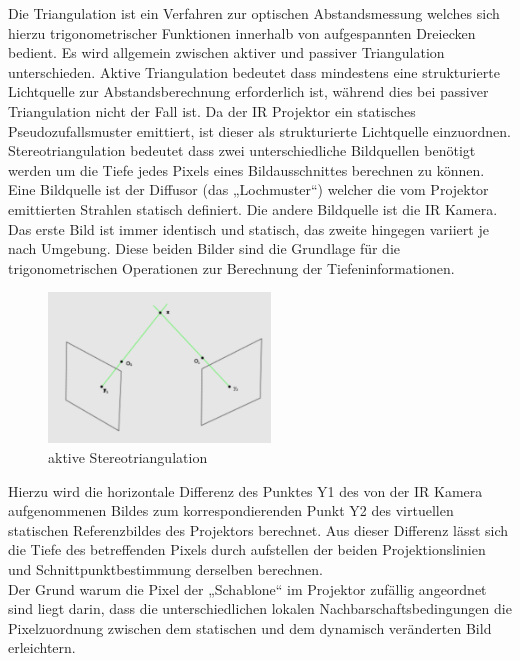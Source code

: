 Die Triangulation ist ein Verfahren zur optischen Abstandsmessung welches sich hierzu trigonometrischer Funktionen innerhalb von aufgespannten Dreiecken bedient. 
Es wird allgemein zwischen aktiver und passiver Triangulation unterschieden.
Aktive Triangulation bedeutet dass mindestens eine strukturierte Lichtquelle zur Abstandsberechnung erforderlich ist, während dies bei passiver Triangulation nicht der Fall ist.
Da der IR Projektor ein statisches Pseudozufallsmuster emittiert, ist dieser als strukturierte Lichtquelle einzuordnen.
Stereotriangulation bedeutet dass zwei unterschiedliche Bildquellen benötigt werden um die Tiefe jedes Pixels eines Bildausschnittes berechnen zu können.
Eine Bildquelle ist der Diffusor (das „Lochmuster“) welcher die vom Projektor emittierten Strahlen statisch definiert. Die andere Bildquelle ist die IR Kamera.
Das erste Bild ist immer identisch und statisch, das zweite hingegen variiert je nach Umgebung. Diese beiden Bilder sind die Grundlage für die trigonometrischen Operationen zur Berechnung der Tiefeninformationen.
\begin{figure}
  \vspace{-20pt}
  \begin{center}
        \includegraphics[height=4cm]{Res/Triangulation.png}
  \end{center}
  \vspace{-20pt}
  \caption{aktive Stereotriangulation }
  \vspace{-10pt}
\end{figure}

 Hierzu wird die horizontale Differenz des Punktes Y1 des von der IR Kamera aufgenommenen Bildes zum korrespondierenden Punkt Y2 des virtuellen statischen Referenzbildes des Projektors berechnet. Aus dieser Differenz lässt sich die Tiefe des betreffenden Pixels durch aufstellen der beiden Projektionslinien und Schnittpunktbestimmung derselben berechnen. \\
 



Der Grund warum die Pixel der „Schablone“ im Projektor zufällig angeordnet sind liegt darin, dass die unterschiedlichen lokalen Nachbarschaftsbedingungen die Pixelzuordnung zwischen dem statischen und dem dynamisch veränderten Bild erleichtern.


